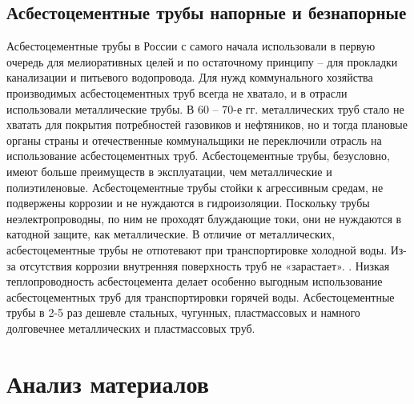 \documentclass[a4paper,12pt,russian]{report}
\begin{document}
\subsection{Асбестоцементные трубы напорные и безнапорные}

Асбестоцементные трубы в России с самого начала использовали в первую очередь для мелиоративных целей и по остаточному принципу – для прокладки канализации и питьевого водопровода. Для нужд коммунального хозяйства производимых асбестоцементных труб всегда не хватало, и в отрасли использовали металлические трубы. В 60 – 70-е гг. металлических труб стало не хватать для покрытия потребностей газовиков и нефтяников, но и тогда плановые органы страны и отечественные коммунальщики не переключили отрасль на использование асбестоцементных труб.
Асбестоцементные трубы, безусловно, имеют больше преимуществ в эксплуатации, чем металлические и полиэтиленовые. Асбестоцементные трубы стойки к агрессивным средам, не подвержены коррозии и не нуждаются в гидроизоляции. Поскольку трубы неэлектропроводны, по ним не проходят блуждающие токи, они не нуждаются в катодной защите, как металлические. В отличие от металлических, асбестоцементные трубы не отпотевают при транспортировке холодной воды. Из-за отсутствия коррозии внутренняя поверхность труб не «зарастает». . Низкая теплопроводность асбестоцемента делает особенно выгодным использование асбестоцементных труб для транспортировки горячей воды. Асбестоцементные трубы в 2-5 раз дешевле стальных, чугунных, пластмассовых и намного долговечнее металлических и пластмассовых труб.

\section{Анализ материалов}
\end{document}
